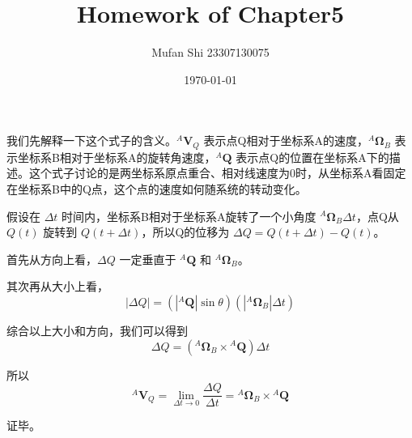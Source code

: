 \documentclass{homework}
\author{Mufan Shi 23307130075}
\date{\today}
\title{Homework of Chapter5}
\begin{document}
 \maketitle

\question

\begin{sol}

我们先解释一下这个式子的含义。$ {^A}\mathbf{V}_Q $ 表示点Q相对于坐标系A的速度，$ {^A}\mathbf{\Omega}_B $ 表示坐标系B相对于坐标系A的旋转角速度，$ {^A}\mathbf{Q} $ 表示点Q的位置在坐标系A下的描述。这个式子讨论的是两坐标系原点重合、相对线速度为0时，从坐标系A看固定在坐标系B中的Q点，这个点的速度如何随系统的转动变化。


假设在 $ \Delta t $ 时间内，坐标系B相对于坐标系A旋转了一个小角度 $ {^A}\mathbf{\Omega}_B \Delta t $，点Q从 $ Q(t) $ 旋转到 $ Q(t + \Delta t) $，所以Q的位移为 $ \Delta Q = Q(t + \Delta t) - Q(t) $。

首先从方向上看，$ \Delta Q $ 一定垂直于 $ {^A}\mathbf{Q} $ 和 $ {^A}\mathbf{\Omega}_B $。

其次再从大小上看，
\[
  |\Delta Q| = (|{^A}\mathbf{Q}| \sin \theta)(|{^A}\mathbf{\Omega}_B| \Delta t)
\]

综合以上大小和方向，我们可以得到
\[
  \Delta Q = ({^A}\mathbf{\Omega}_B \times {^A}\mathbf{Q}) \Delta t
\]

所以
\[
  {^A}\mathbf{V}_Q = \lim_{\Delta t \to 0} \frac{\Delta Q}{\Delta t} = {^A}\mathbf{\Omega}_B \times {^A}\mathbf{Q}
\]

证毕。

\end{sol}

\question 
\end{document}
